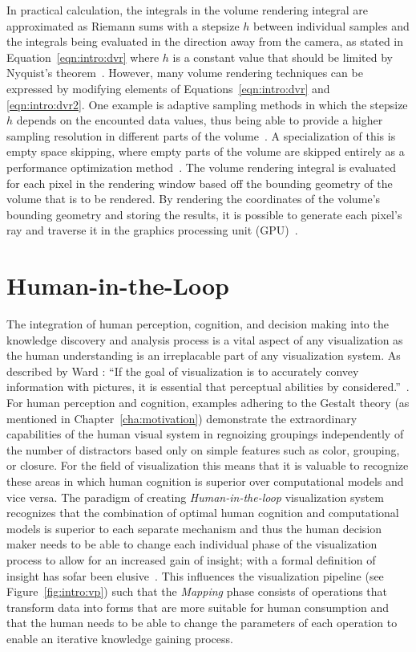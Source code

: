 In practical calculation, the integrals in the volume rendering integral are approximated as Riemann sums with a stepsize $h$ between individual samples and the integrals being evaluated in the direction away from the camera, as stated in Equation~\ref{eqn:intro:dvr} where $h$ is a constant value that should be limited by Nyquist's theorem~\cite{shannon1949communication}.  However, many volume rendering techniques can be expressed by modifying elements of Equations~\ref{eqn:intro:dvr} and \ref{eqn:intro:dvr2}.  One example is adaptive sampling methods in which the stepsize $h$ depends on the encounted data values, thus being able to provide a higher sampling resolution in different parts of the volume~\cite{danskin1992fast}.  A specialization of this is empty space skipping, where empty parts of the volume are skipped entirely as a performance optimization method~\cite{yagel1993accelerating}.  The volume rendering integral is evaluated for each pixel in the rendering window based off the bounding geometry of the volume that is to be rendered.  By rendering the coordinates of the volume's bounding geometry and storing the results, it is possible to generate each pixel's ray and traverse it in the graphics processing unit (GPU)~\cite{kruger2003acceleration}.

\section{Human-in-the-Loop} \label{cha:intro:hitl}
The integration of human perception, cognition, and decision making into the knowledge discovery and analysis process is a vital aspect of any visualization as the human understanding is an irreplacable part of any visualization system.  As described by Ward \etal : ``If the goal of visualization is to accurately convey information with pictures, it is essential that perceptual abilities by considered.''~\cite{ward2010interactive}.  For human perception and cognition, examples adhering to the Gestalt theory (as mentioned in Chapter~\ref{cha:motivation}) demonstrate the extraordinary capabilities of the human visual system in regnoizing groupings independently of the number of distractors based only on simple features such as color, grouping, or closure.  For the field of visualization this means that it is valuable to recognize these areas in which human cognition is superior over computational models and vice versa.  The paradigm of creating \emph{Human-in-the-loop} visualization system recognizes that the combination of optimal human cognition and computational models is superior to each separate mechanism and thus the human decision maker needs to be able to change each individual phase of the visualization process to allow for an increased gain of insight; with a formal definition of insight has sofar been elusive~\cite{north2006toward}.  This influences the visualization pipeline (see Figure~\ref{fig:intro:vp}) such that the \emph{Mapping} phase consists of operations that transform data into forms that are more suitable for human consumption and that the human needs to be able to change the parameters of each operation to enable an iterative knowledge gaining process.

